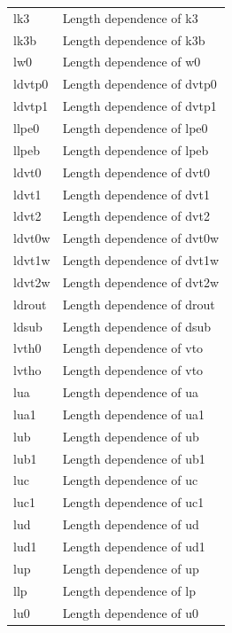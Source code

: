 \begin{longtable}{l l}
{\small lk3} & {\small Length dependence of k3} \\
{\small lk3b} & {\small Length dependence of k3b} \\
{\small lw0} & {\small Length dependence of w0} \\
{\small ldvtp0} & {\small Length dependence of dvtp0} \\
{\small ldvtp1} & {\small Length dependence of dvtp1} \\
{\small llpe0} & {\small Length dependence of lpe0} \\
{\small llpeb} & {\small Length dependence of lpeb} \\
{\small ldvt0} & {\small Length dependence of dvt0} \\
{\small ldvt1} & {\small Length dependence of dvt1} \\
{\small ldvt2} & {\small Length dependence of dvt2} \\
{\small ldvt0w} & {\small Length dependence of dvt0w} \\
{\small ldvt1w} & {\small Length dependence of dvt1w} \\
{\small ldvt2w} & {\small Length dependence of dvt2w} \\
{\small ldrout} & {\small Length dependence of drout} \\
{\small ldsub} & {\small Length dependence of dsub} \\
{\small lvth0} & {\small Length dependence of vto} \\
{\small lvtho} & {\small Length dependence of vto} \\
{\small lua} & {\small Length dependence of ua} \\
{\small lua1} & {\small Length dependence of ua1} \\
{\small lub} & {\small Length dependence of ub} \\
{\small lub1} & {\small Length dependence of ub1} \\
{\small luc} & {\small Length dependence of uc} \\
{\small luc1} & {\small Length dependence of uc1} \\
{\small lud} & {\small Length dependence of ud} \\
{\small lud1} & {\small Length dependence of ud1} \\
{\small lup} & {\small Length dependence of up} \\
{\small llp} & {\small Length dependence of lp} \\
{\small lu0} & {\small Length dependence of u0} \\

\end{longtable}
